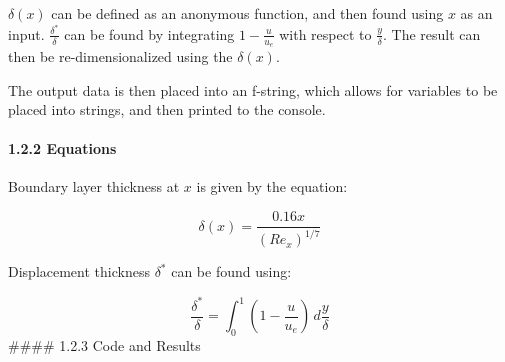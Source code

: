 \documentclass[11pt]{article}
\begin{document}
\(\delta(x)\) can be defined as an anonymous function, and then found
using \(x\) as an input. \(\frac{\delta^*}{\delta}\) can be found by
integrating \(1 - \frac{u}{u_e}\) with respect to \(\frac{y}{\delta}\).
The result can then be re-dimensionalized using the \(\delta(x)\).

The output data is then placed into an f-string, which allows for
variables to be placed into strings, and then printed to the console.

\hypertarget{equations}{%
\paragraph{1.2.2 \textbar{} Equations}\label{equations}}

Boundary layer thickness at \(x\) is given by the equation:

\[\begin{equation}
    \delta(x) = \frac{0.16x}{(Re_x)^{1/7}}
\end{equation}\]

Displacement thickness \(\delta^*\) can be found using:

\[\begin{equation}
    \frac{\delta^*}{\delta} = \int_0^1 (1-\frac{u}{u_e})\, d\frac{y}{\delta}
\end{equation}\] \#\#\#\# 1.2.3 \textbar{} Code and Results
\end{document}
